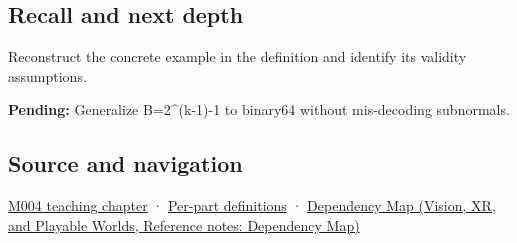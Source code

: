 \subsection{Recall and next depth}\label{appendix-2fae058c82e1-recall-and-next-depth}

\hypertarget{appendix-2fae058c82e1-recall-and-next-depth}{}

Reconstruct the concrete example in the definition and identify its validity assumptions.

\textbf{Pending:} Generalize B=2\^{}(k-1)-1 to binary64 without mis-decoding subnormals.

\subsection{Source and navigation}\label{appendix-2fae058c82e1-source-and-navigation}

\hypertarget{appendix-2fae058c82e1-source-and-navigation}{}

\hyperref[01-foundations-i-ch001-a-stretching-ruler-for-real-valued-quantities]{M004 teaching chapter} · \hyperref[appendix-fd090d982a15-m004---parts-61-76]{Per-part definitions} · \href{../07-Vision-XR-and-Playable-Worlds/main.pdf\#nameddest=appendix-4ad47bdd269a}{Dependency Map (Vision, XR, and Playable Worlds, Reference notes: Dependency Map)}
